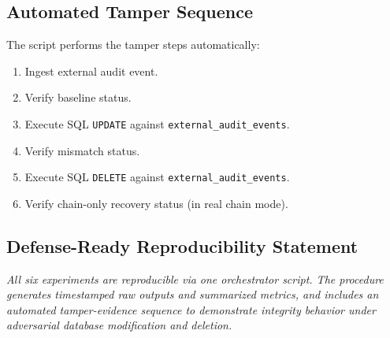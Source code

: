 \subsection{Automated Tamper Sequence}

The script performs the tamper steps automatically:
\begin{enumerate}
  \item Ingest external audit event.
  \item Verify baseline status.
  \item Execute SQL \texttt{UPDATE} against \texttt{external\_audit\_events}.
  \item Verify mismatch status.
  \item Execute SQL \texttt{DELETE} against \texttt{external\_audit\_events}.
  \item Verify chain-only recovery status (in real chain mode).
\end{enumerate}

\subsection{Defense-Ready Reproducibility Statement}

\textit{All six experiments are reproducible via one orchestrator script. The procedure generates timestamped raw outputs and summarized metrics, and includes an automated tamper-evidence sequence to demonstrate integrity behavior under adversarial database modification and deletion.}

